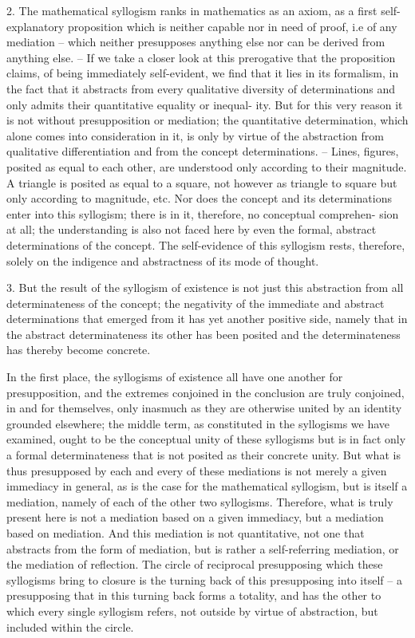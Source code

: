 2. The mathematical syllogism ranks in mathematics as an axiom, as a first
self-explanatory proposition which is neither capable nor in need of proof,
i.e of any mediation – which neither presupposes anything else nor can be
derived from anything else. – If we take a closer look at this prerogative that
the proposition claims, of being immediately self-evident, we find that it lies
in its formalism, in the fact that it abstracts from every qualitative diversity
of determinations and only admits their quantitative equality or inequal-
ity. But for this very reason it is not without presupposition or mediation;
the quantitative determination, which alone comes into consideration in
it, is only by virtue of the abstraction from qualitative differentiation and
from the concept determinations. – Lines, figures, posited as equal to each
other, are understood only according to their magnitude. A triangle is
posited as equal to a square, not however as triangle to square but only
according to magnitude, etc. Nor does the concept and its determinations
enter into this syllogism; there is in it, therefore, no conceptual comprehen-
sion at all; the understanding is also not faced here by even the formal,
abstract determinations of the concept. The self-evidence of this syllogism
rests, therefore, solely on the indigence and abstractness of its mode of
thought.

3. But the result of the syllogism of existence is not just this abstraction
from all determinateness of the concept; the negativity of the immediate
and abstract determinations that emerged from it has yet another positive
side, namely that in the abstract determinateness its other has been posited
and the determinateness has thereby become concrete.

In the first place, the syllogisms of existence all have one another for
presupposition, and the extremes conjoined in the conclusion are truly
conjoined, in and for themselves, only inasmuch as they are otherwise
united by an identity grounded elsewhere; the middle term, as constituted
in the syllogisms we have examined, ought to be the conceptual unity of
these syllogisms but is in fact only a formal determinateness that is not
posited as their concrete unity. But what is thus presupposed by each and
every of these mediations is not merely a given immediacy in general, as is
the case for the mathematical syllogism, but is itself a mediation, namely
of each of the other two syllogisms. Therefore, what is truly present here
is not a mediation based on a given immediacy, but a mediation based on
mediation. And this mediation is not quantitative, not one that abstracts
from the form of mediation, but is rather a self-referring mediation, or the
mediation of reflection. The circle of reciprocal presupposing which these
syllogisms bring to closure is the turning back of this presupposing into
itself – a presupposing that in this turning back forms a totality, and has
the other to which every single syllogism refers, not outside by virtue of
abstraction, but included within the circle.

